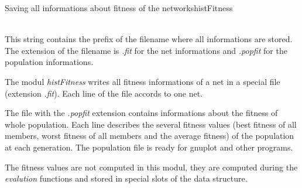 \begin{moduledoc}{Saving all informations about fitness of the networks}{histFitness}

\item[\KeyWord{historyFile} \Param{filename}]~\\
This string contains the prefix of the filename where all informations are stored.
The extension of the filename is {\it .fit} for the net informations and
{\it .popfit} for the population informations.
\end{moduledoc}

The modul {\it histFitness} writes all fitness informations of a net in a 
special file (extension {\it .fit}).
Each line of the file accords to one net. 


The file with the {\it .popfit} extension contains informations about the 
fitness of whole population. 
Each line describes the several fitness values (best fitness of all members, 
worst fitness of all members and the average fitness) of the population 
at each generation.  The population file is ready for gnuplot and other
programs.

The fitness values are not computed in this modul, they are computed during 
the {\it evalution} functions and stored in special slots of the 
data structure.

